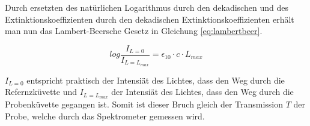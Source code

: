 Durch ersetzten des natürlichen Logarithmus durch den dekadischen und des Extinktionskoeffizienten durch den dekadischen Extinktionskoeffizienten erhält man nun das Lambert-Beersche Gesetz in Gleichung \ref{eq:lambertbeer}.

\begin {equation}
log \frac{{I_{L=0}}}{I_{L=L_{max}}}=\epsilon_{10} \cdot c \cdot L_{max}
\label{eq:lambertbeer}
\end{equation}

$I_{L=0}$ entspricht praktisch der Intensiät des Lichtes, dass den Weg durch die Refernzküvette und $ I_{L=L_{max}}$ der Intensiät des Lichtes, dass den Weg durch die Probenküvette gegangen ist. Somit ist dieser Bruch gleich der Transmission $T$ der Probe, welche durch das Spektrometer gemessen wird. 


%


